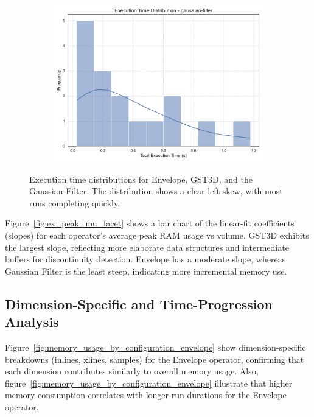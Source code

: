 \begin{figure}[htbp]
\begin{subfigure}[t]{0.49\textwidth}
        \includegraphics[width=\textwidth]{assets/images/05/execution_time_distribution_gaussian-filter}
    \end{subfigure}
    \caption{Execution time distributions for Envelope, \ac{GST3D}, and the Gaussian Filter.
    The distribution shows a clear left skew, with most runs completing quickly.}
    \label{fig:execution_time_distribution_facet}
\end{figure}

Figure~\ref{fig:ex_peak_mu_facet} shows a bar chart of the linear-fit coefficients (slopes) for each operator’s average peak \ac{RAM} usage vs volume.
\ac{GST3D} exhibits the largest slope, reflecting more elaborate data structures and intermediate buffers for discontinuity detection.
Envelope has a moderate slope, whereas Gaussian Filter is the least steep, indicating more incremental memory use.

\subsection{Dimension-Specific and Time-Progression Analysis}
\label{subsec:dimension-specific-and-time-progression-analysis}

Figure~\ref{fig:memory_usage_by_configuration_envelope} show dimension-specific breakdowns (inlines, xlines, samples) for the Envelope operator, confirming that each dimension contributes similarly to overall memory usage.
Also, figure~\ref{fig:memory_usage_by_configuration_envelope} illustrate that higher memory consumption correlates with longer run durations for the Envelope operator.

